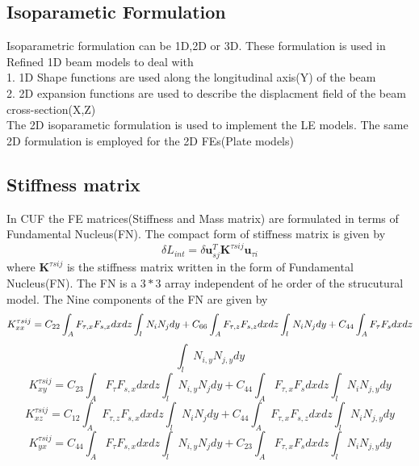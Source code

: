 \documentclass[a4paper,12pt]{article}
\begin{document}
\newpage
\subsection*{Isoparametic Formulation}
\indent\indent\indent\indent Isoparametric formulation can be 1D,2D or 3D. These formulation is used in Refined 1D beam models to deal with\\
1. 1D Shape functions are used along the longitudinal axis(Y) of the beam\\
2. 2D expansion functions are used to describe the displacment field of the beam cross-section(X,Z)\\
The 2D isoparametic formulation is used to implement the LE models. The same 2D formulation is employed for the 2D FEs(Plate models)

\subsection*{Stiffness matrix}
\indent\indent\indent\indent In CUF the FE matrices(Stiffness and Mass matrix) are formulated in terms of Fundamental Nucleus(FN). The compact form of stiffness matrix is given by
\begin{equation}
\delta L_{int} = \delta \textbf{u}_{sj}^{T} \textbf{K}^{\tau s i j} \textbf{u}_{\tau i}
\label{Internal}   
\end{equation}
where $\textbf{K}^{\tau s i j}$ is the stiffness matrix written in the form of Fundamental Nucleus(FN). The FN is a $3*3$ array independent of he order of the strucutural model. The Nine components of the FN are given by\\

$$K_{xx}^{\tau s i j} = C_{22} \int_{A}^{} F_{\tau,x} F_{s,x} dx dz \int_{l}^{} N_{i} N_{j} dy + C_{66} \int_{A}^{} F_{\tau,z} F_{s,z} dx dz \int_{l}^{} N_{i} N_{j} dy + C_{44} \int_{A}^{} F_{\tau} F_{s} dx dz\\$$ $$\int_{l}^{} N_{i,y} N_{j,y} dy $$
$$ K_{xy}^{\tau s i j} = C_{23} \int_{A}^{} F_{\tau} F_{s,x} dx dz \int_{l}^{} N_{i,y} N_{j} dy + C_{44} \int_{A}^{} F_{\tau,x} F_{s} dx dz \int_{l}^{} N_{i} N_{j,y} dy$$
$$ K_{xz}^{\tau s i j} = C_{12} \int_{A}^{} F_{\tau,z} F_{s,x} dx dz \int_{l}^{} N_{i} N_{j} dy + C_{44} \int_{A}^{} F_{\tau,x} F_{s,z} dx dz \int_{l}^{} N_{i} N_{j,y} dy$$
$$ K_{yx}^{\tau s i j} = C_{44} \int_{A}^{} F_{\tau} F_{s,x} dx dz \int_{l}^{} N_{i,y} N_{j} dy + C_{23} \int_{A}^{} F_{\tau,x} F_{s} dx dz \int_{l}^{} N_{i} N_{j,y} dy$$
\end{document}
